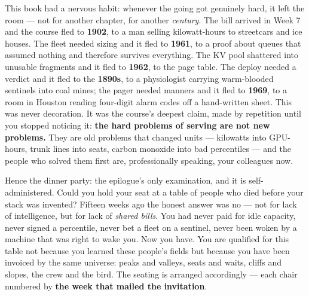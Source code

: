 This book had a nervous habit: whenever the going got genuinely hard, it left the room — not for another chapter, for another \textit{century}. The bill arrived in Week 7 and the course fled to \textbf{1902}, to a man selling kilowatt-hours to streetcars and ice houses. The fleet needed sizing and it fled to \textbf{1961}, to a proof about queues that assumed nothing and therefore survives everything. The KV pool shattered into unusable fragments and it fled to \textbf{1962}, to the page table. The deploy needed a verdict and it fled to the \textbf{1890s}, to a physiologist carrying warm-blooded sentinels into coal mines; the pager needed manners and it fled to \textbf{1969}, to a room in Houston reading four-digit alarm codes off a hand-written sheet. This was never decoration. It was the course's deepest claim, made by repetition until you stopped noticing it: \textbf{the hard problems of serving are not new problems.} They are old problems that changed units — kilowatts into GPU-hours, trunk lines into seats, carbon monoxide into bad percentiles — and the people who solved them first are, professionally speaking, your colleagues now.

Hence the dinner party: the epilogue's only examination, and it is self-administered. Could you hold your seat at a table of people who died before your stack was invented? Fifteen weeks ago the honest answer was no — not for lack of intelligence, but for lack of \textit{shared bills}. You had never paid for idle capacity, never signed a percentile, never bet a fleet on a sentinel, never been woken by a machine that was right to wake you. Now you have. You are qualified for this table not because you learned these people's fields but because you have been invoiced by the same universe: peaks and valleys, seats and waits, cliffs and slopes, the crew and the bird. The seating is arranged accordingly — each chair numbered by \textbf{the week that mailed the invitation}.

